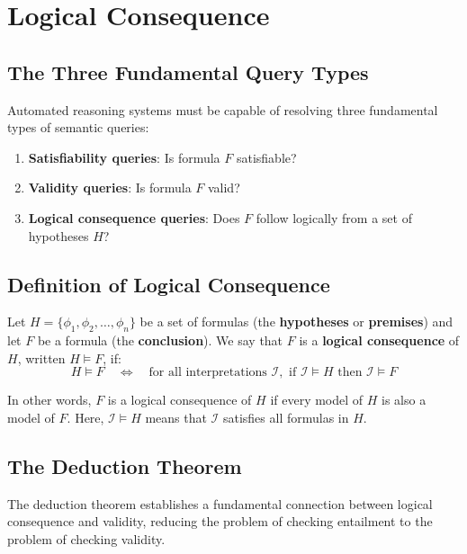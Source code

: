 \documentclass[11pt,a4paper]{article}
\theoremstyle{definition}
\theoremstyle{plain}
\theoremstyle{remark}
\begin{document}
\section{Logical Consequence}

\subsection{The Three Fundamental Query Types}

Automated reasoning systems must be capable of resolving three fundamental types of semantic queries:
\begin{enumerate}
    \item \textbf{Satisfiability queries}: Is formula $F$ satisfiable?
    \item \textbf{Validity queries}: Is formula $F$ valid?
    \item \textbf{Logical consequence queries}: Does $F$ follow logically from a set of hypotheses $H$?
\end{enumerate}

\subsection{Definition of Logical Consequence}

\begin{tcolorbox}[colback=cyan!5!white,colframe=cyan!75!black,title=\textbf{Logical Consequence}]
Let $H = \{\phi_1, \phi_2, \dots, \phi_n\}$ be a set of formulas (the \textbf{hypotheses} or \textbf{premises}) and let $F$ be a formula (the \textbf{conclusion}). We say that $F$ is a \textbf{logical consequence} of $H$, written $H \models F$, if:
\[
H \models F \quad \Leftrightarrow \quad \text{for all interpretations } \mathcal{I}, \text{ if } \mathcal{I} \models H \text{ then } \mathcal{I} \models F
\]
\end{tcolorbox}

In other words, $F$ is a logical consequence of $H$ if every model of $H$ is also a model of $F$. Here, $\mathcal{I} \models H$ means that $\mathcal{I}$ satisfies all formulas in $H$.

\subsection{The Deduction Theorem}

The deduction theorem establishes a fundamental connection between logical consequence and validity, reducing the problem of checking entailment to the problem of checking validity.
\end{document}
